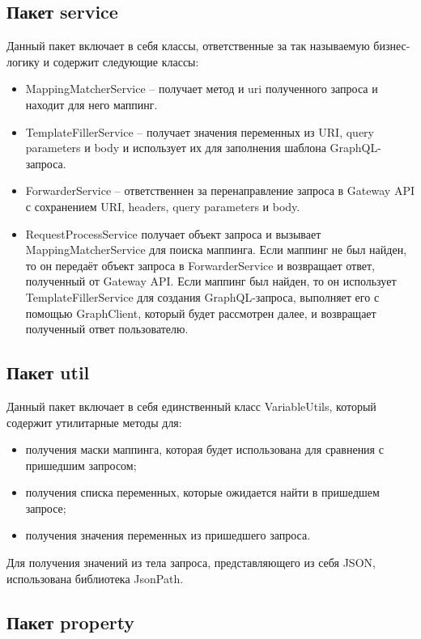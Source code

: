\subsection{Пакет service}

Данный пакет включает в себя классы, ответственные за так называемую бизнес-логику и содержит следующие классы:

\begin{itemize}
	\item MappingMatcherService – получает метод и uri полученного запроса и находит для него маппинг.
	\item TemplateFillerService – получает значения переменных из URI, query parameters и body и использует их для заполнения шаблона GraphQL-запроса.
	\item ForwarderService – ответственнен за перенаправление запроса в Gateway API с сохранением URI, headers, query parameters и body.
	\item RequestProcessService получает объект запроса и вызывает MappingMatcherService для поиска маппинга.
	Если маппинг не был найден, то он передаёт объект запроса в ForwarderService и возвращает ответ, полученный от Gateway API. Если маппинг был найден, то он использует TemplateFillerService для создания GraphQL-запроса, выполняет его с помощью GraphClient, который будет рассмотрен далее, и возвращает полученный ответ пользователю.
\end{itemize}


\subsection{Пакет util}

Данный пакет включает в себя единственный класс VariableUtils, который содержит утилитарные методы для:

\begin{itemize}
	\item получения маски маппинга, которая будет использована для сравнения с пришедшим запросом;
	\item получения списка переменных, которые ожидается найти в пришедшем запросе;
	\item получения значения переменных из пришедшего запроса.
\end{itemize}

Для получения значений из тела запроса, представляющего из себя JSON, использована библиотека JsonPath.

\subsection{Пакет property}

